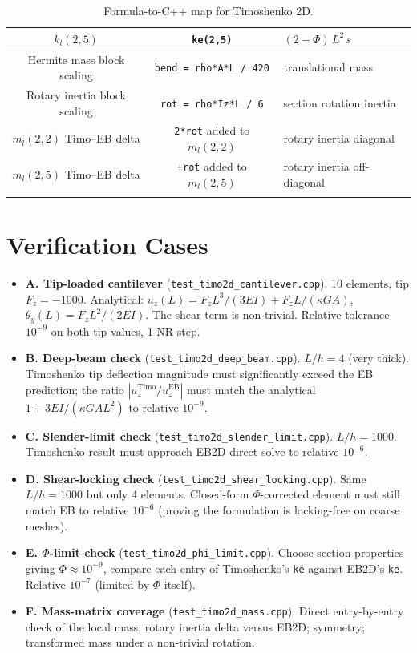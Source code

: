 \documentclass[11pt,a4paper]{article}
\begin{document}
\begin{longtable}{c c l}
$k_l(2,5)$            & \texttt{ke(2,5)} & $(2-\Phi)\,L^2\,s$ \\
\midrule
Hermite mass block scaling & \texttt{bend = rho*A*L / 420} & translational mass \\
Rotary inertia block scaling & \texttt{rot = rho*Iz*L / 6} & section rotation inertia \\
$m_l(2,2)$ Timo--EB delta  & \texttt{2*rot} added to $m_l(2,2)$ & rotary inertia diagonal \\
$m_l(2,5)$ Timo--EB delta  & \texttt{+rot} added to $m_l(2,5)$ & rotary inertia off-diagonal \\
\bottomrule
\caption{Formula-to-C++ map for Timoshenko 2D.}
\end{longtable}

\section{Verification Cases}\label{sec:verification}

\begin{itemize}
    \item \textbf{A. Tip-loaded cantilever} (\texttt{test\_timo2d\_cantilever.cpp}). 10 elements, tip $F_z = -1000$. Analytical: $u_z(L) = F_z L^3/(3 EI) + F_z L/(\kappa GA)$, $\theta_y(L) = F_z L^2/(2 EI)$. The shear term is non-trivial. Relative tolerance $10^{-9}$ on both tip values, 1 NR step.
    \item \textbf{B. Deep-beam check} (\texttt{test\_timo2d\_deep\_beam.cpp}). $L/h = 4$ (very thick). Timoshenko tip deflection magnitude must significantly exceed the EB prediction; the ratio $|u_z^{\text{Timo}}/u_z^{\text{EB}}|$ must match the analytical $1 + 3 EI/(\kappa GA L^2)$ to relative $10^{-9}$.
    \item \textbf{C. Slender-limit check} (\texttt{test\_timo2d\_slender\_limit.cpp}). $L/h = 1000$. Timoshenko result must approach EB2D direct solve to relative $10^{-6}$.
    \item \textbf{D. Shear-locking check} (\texttt{test\_timo2d\_shear\_locking.cpp}). Same $L/h = 1000$ but only 4 elements. Closed-form $\Phi$-corrected element must still match EB to relative $10^{-6}$ (proving the formulation is locking-free on coarse meshes).
    \item \textbf{E. $\Phi$-limit check} (\texttt{test\_timo2d\_phi\_limit.cpp}). Choose section properties giving $\Phi \approx 10^{-9}$, compare each entry of Timoshenko's \texttt{ke} against EB2D's \texttt{ke}. Relative $10^{-7}$ (limited by $\Phi$ itself).
    \item \textbf{F. Mass-matrix coverage} (\texttt{test\_timo2d\_mass.cpp}). Direct entry-by-entry check of the local mass; rotary inertia delta versus EB2D; symmetry; transformed mass under a non-trivial rotation.
\end{itemize}
\end{document}

